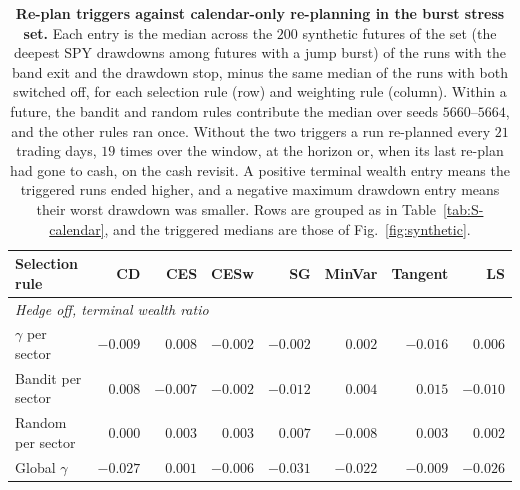 \begin{table}[H]
\centering
\small
\setlength{\tabcolsep}{4pt}
\caption{\textbf{Re-plan triggers against calendar-only re-planning in the burst stress set.} Each entry is the
median across the $200$ synthetic futures of the set (the deepest SPY drawdowns among futures with a jump burst) of
the runs with the band exit and the drawdown stop, minus the same median of the runs with both switched off, for
each selection rule (row) and weighting rule (column). Within a future, the bandit and random rules contribute the
median over seeds $5660$--$5664$, and the other rules ran once. Without the two triggers a run re-planned every
$21$ trading days, $19$ times over the window, at the horizon or, when its last re-plan had gone to cash, on the
cash revisit. A positive terminal wealth entry means the triggered runs ended higher, and a negative maximum
drawdown entry means their worst drawdown was smaller. Rows are grouped as in Table~\ref{tab:S-calendar}, and the
triggered medians are those of Fig.~\ref{fig:synthetic}.}
\label{tab:S-calendar-burst}
\begin{tabular}{l*{7}{r}}
\toprule
Selection rule & CD & CES & CESw & SG & MinVar & Tangent & LS \\
\midrule
\multicolumn{8}{l}{\emph{Hedge off, terminal wealth ratio}} \\
$\gamma$ per sector & $-0.009$ & $0.008$ & $-0.002$ & $-0.002$ & $0.002$ & $-0.016$ & $0.006$ \\
Bandit per sector & $0.008$ & $-0.007$ & $-0.002$ & $-0.012$ & $0.004$ & $0.015$ & $-0.010$ \\
Random per sector & $0.000$ & $0.003$ & $0.003$ & $0.007$ & $-0.008$ & $0.003$ & $0.002$ \\
\addlinespace[2pt]
Global $\gamma$ & $-0.027$ & $0.001$ & $-0.006$ & $-0.031$ & $-0.022$ & $-0.009$ & $-0.026$ \\

\end{tabular}
\end{table}
